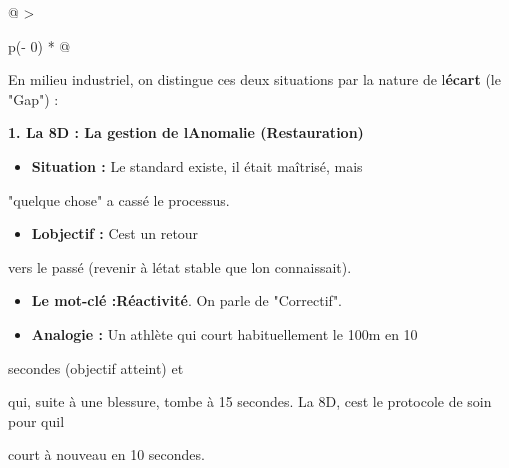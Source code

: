 \documentclass[
]{article}
\begin{document}
\begin{longtable}[]{@{}
  >{\raggedright\arraybackslash}p{(\columnwidth - 0\tabcolsep) * }@{}}
\toprule\noalign{}
\begin{minipage}[b]{\linewidth}\raggedright
\begin{center}
\end{center}

\begin{center}
\end{center}

En milieu industriel, on distingue ces deux situations par la nature de
l\textquotesingle{}\textbf{écart} (le "Gap") :

\textbf{1. La 8D : La gestion de l\textquotesingle Anomalie
(Restauration)}

\begin{itemize}
\item \textbf{Situation :} Le standard existe, il était maîtrisé, mais
\end{itemize}
"quelque chose" a cassé le processus.

\begin{itemize}
\item \textbf{L\textquotesingle objectif :} C\textquotesingle est un retour
\end{itemize}
vers le passé (revenir à l\textquotesingle état stable que
l\textquotesingle on connaissait).

\begin{itemize}
\item \textbf{Le mot-clé :Réactivité}. On parle de "Correctif".

\item \textbf{Analogie :} Un athlète qui court habituellement le 100m en 10
\end{itemize}
secondes (objectif atteint) et

qui, suite à une blessure, tombe à 15 secondes. La 8D,
c\textquotesingle est le protocole de soin pour qu\textquotesingle il

court à nouveau en 10 secondes.


\end{minipage}
\end{longtable}
\end{document}
